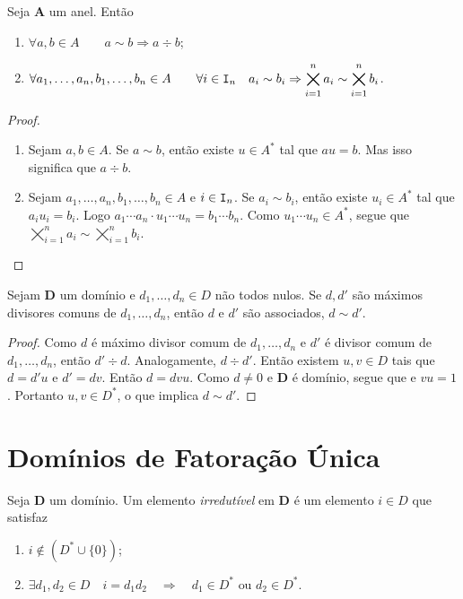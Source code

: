 \begin{prop}
	Seja $\bm A$ um anel. Então
	\begin{enumerate}
	\item $\forall a,b \in A \qquad a \sim b \Rightarrow a \div b$;
	\item $\forall a_1,\ldots,a_n,b_1,\ldots,b_n \in A \qquad \forall i \in \mathtt I_n \quad a_i \sim b_i \Rightarrow \displaystyle\bigtimes_{i=1}^n a_i \sim \displaystyle\bigtimes_{i=1}^n b_i$.
	\end{enumerate}
\end{prop}
\begin{proof}
	\begin{enumerate}
	\item Sejam $a,b \in A$. Se $a \sim b$, então existe $u \in A^*$ tal que $au=b$. Mas isso significa que $a \div b$.
	\item Sejam $a_1,\ldots,a_n,b_1,\ldots,b_n \in A$ e $i \in \mathtt I_n$. Se $a_i \sim b_i$, então existe $u_i \in A^*$ tal que $a_iu_i = b_i$. Logo $a_1 \cdots a_n \cdot u_1 \cdots u_n = b_1 \cdots b_n$. Como $u_1 \cdots u_n \in A^*$, segue que $\displaystyle\bigtimes_{i=1}^n a_i \sim \displaystyle\bigtimes_{i=1}^n b_i$.
	\end{enumerate}
\end{proof}

\begin{prop}
	Sejam $\bm D$ um domínio e $d_1, \ldots, d_n \in D$ não todos nulos. Se $d,d'$ são máximos divisores comuns de $d_1,\ldots,d_n$, então $d$ e $d'$ são associados, $d \sim d'$.
\end{prop}
\begin{proof}
	Como $d$ é máximo divisor comum de $d_1,\ldots,d_n$ e $d'$ é divisor comum de $d_1,\ldots,d_n$, então $d' \div d$. Analogamente, $d \div d'$. Então existem $u,v \in D$ tais que $d=d'u$ e $d'=dv$. Então $d=dvu$. Como $d \neq 0$ e $\bm D$ é domínio, segue que e $vu=1$. Portanto $u,v \in D^*$, o que implica $d \sim d'$.
\end{proof}

\section{Domínios de Fatoração Única}

\begin{defi}
	Seja $\bm D$ um domínio. Um elemento \emph{irredutível} em $\bm D$ é um elemento $i \in D$ que satisfaz
	\begin{enumerate}
	\item  $i \notin (D^* \cup \{0\})$;
	\item $\exists d_1,d_2 \in D \quad i = d_1d_2  \quad \Rightarrow \quad d_1 \in D^* \text{\ \ ou\ \ } d_2 \in D^*$.
	\end{enumerate}
\end{defi}

